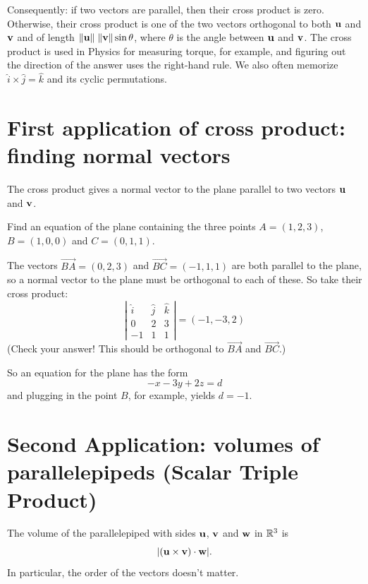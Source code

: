 Consequently:
if two vectors are parallel, then their cross product
is zero.  Otherwise, their cross product is one of the two vectors orthogonal to both 
$\mathbf{u}$ and $\mathbf{v}$ and of length $\Vert \mathbf{u} \Vert \; \Vert \mathbf{v} \Vert \sin\theta$, where $\theta$ is the angle between $\mathbf{u}$ and $\mathbf{v}$.
The cross product is used in Physics for measuring torque, for example,
and figuring out the direction of the answer uses the
right-hand rule.  We also often memorize $\hat{i} \times \hat{j} = \hat{k}$ and its cyclic permutations.

\section{First application of cross product: finding normal vectors}

The cross product gives a normal vector to the plane parallel to two vectors $\mathbf{u}$ and $\mathbf{v}$.

\begin{myprob}
Find an equation of the plane containing the three points $A = (1,2,3)$,
$B = (1,0,0)$ and $C = (0,1,1)$.

\begin{mysol}
The vectors $\vec{BA} = (0,2,3)$ and $\vec{BC} = (-1,1,1)$ are both
parallel to the plane, so a normal vector to the plane must be
orthogonal to each of these.  So take their cross product:
$$
 \left| \begin{matrix}
\hat{i} & \hat{j} & \hat{k} \\
0 & 2 & 3\\
-1 & 1 & 1 \end{matrix} \right| = (-1, -3, 2)
$$
(Check your answer!  This should be orthogonal to $\vec{BA}$
and $\vec{BC}$.)

So an equation for the plane has the form
$$
-x -3y + 2z = d
$$
and plugging in the point $B$, for example, yields $d=-1$.
\end{mysol}\end{myprob}

\section{Second Application:  volumes of parallelepipeds (Scalar Triple Product)}

\begin{theorem}
The volume of the parallelepiped with sides $\mathbf{u}$, $\mathbf{v}$ and $\mathbf{w}$
in $\mathbb{R}^3$ is
$$
\vert (\mathbf{u} \times \mathbf{v}) \cdot \mathbf{w} \vert. 
$$
In particular, the order of the vectors doesn't matter.
\end{theorem}

